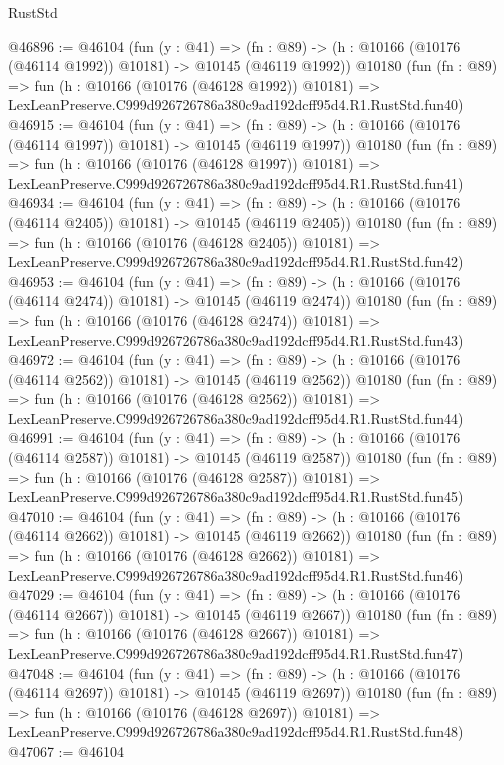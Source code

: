 \begin{lexlean}{RustStd}
\begin{coremodule}
@46896 := @46104
    (fun (y : @41) =>
    (fn : @89) -> (h : @10166 (@10176 (@46114 @1992)) @10181) -> @10145 (@46119 @1992))
    @10180
    (fun (fn : @89) =>
    fun (h : @10166 (@10176 (@46128 @1992)) @10181) =>
    LexLeanPreserve.C999d926726786a380c9ad192dcff95d4.R1.RustStd.fun40)
@46915 := @46104
    (fun (y : @41) =>
    (fn : @89) -> (h : @10166 (@10176 (@46114 @1997)) @10181) -> @10145 (@46119 @1997))
    @10180
    (fun (fn : @89) =>
    fun (h : @10166 (@10176 (@46128 @1997)) @10181) =>
    LexLeanPreserve.C999d926726786a380c9ad192dcff95d4.R1.RustStd.fun41)
@46934 := @46104
    (fun (y : @41) =>
    (fn : @89) -> (h : @10166 (@10176 (@46114 @2405)) @10181) -> @10145 (@46119 @2405))
    @10180
    (fun (fn : @89) =>
    fun (h : @10166 (@10176 (@46128 @2405)) @10181) =>
    LexLeanPreserve.C999d926726786a380c9ad192dcff95d4.R1.RustStd.fun42)
@46953 := @46104
    (fun (y : @41) =>
    (fn : @89) -> (h : @10166 (@10176 (@46114 @2474)) @10181) -> @10145 (@46119 @2474))
    @10180
    (fun (fn : @89) =>
    fun (h : @10166 (@10176 (@46128 @2474)) @10181) =>
    LexLeanPreserve.C999d926726786a380c9ad192dcff95d4.R1.RustStd.fun43)
@46972 := @46104
    (fun (y : @41) =>
    (fn : @89) -> (h : @10166 (@10176 (@46114 @2562)) @10181) -> @10145 (@46119 @2562))
    @10180
    (fun (fn : @89) =>
    fun (h : @10166 (@10176 (@46128 @2562)) @10181) =>
    LexLeanPreserve.C999d926726786a380c9ad192dcff95d4.R1.RustStd.fun44)
@46991 := @46104
    (fun (y : @41) =>
    (fn : @89) -> (h : @10166 (@10176 (@46114 @2587)) @10181) -> @10145 (@46119 @2587))
    @10180
    (fun (fn : @89) =>
    fun (h : @10166 (@10176 (@46128 @2587)) @10181) =>
    LexLeanPreserve.C999d926726786a380c9ad192dcff95d4.R1.RustStd.fun45)
@47010 := @46104
    (fun (y : @41) =>
    (fn : @89) -> (h : @10166 (@10176 (@46114 @2662)) @10181) -> @10145 (@46119 @2662))
    @10180
    (fun (fn : @89) =>
    fun (h : @10166 (@10176 (@46128 @2662)) @10181) =>
    LexLeanPreserve.C999d926726786a380c9ad192dcff95d4.R1.RustStd.fun46)
@47029 := @46104
    (fun (y : @41) =>
    (fn : @89) -> (h : @10166 (@10176 (@46114 @2667)) @10181) -> @10145 (@46119 @2667))
    @10180
    (fun (fn : @89) =>
    fun (h : @10166 (@10176 (@46128 @2667)) @10181) =>
    LexLeanPreserve.C999d926726786a380c9ad192dcff95d4.R1.RustStd.fun47)
@47048 := @46104
    (fun (y : @41) =>
    (fn : @89) -> (h : @10166 (@10176 (@46114 @2697)) @10181) -> @10145 (@46119 @2697))
    @10180
    (fun (fn : @89) =>
    fun (h : @10166 (@10176 (@46128 @2697)) @10181) =>
    LexLeanPreserve.C999d926726786a380c9ad192dcff95d4.R1.RustStd.fun48)
@47067 := @46104

\end{coremodule}
\end{lexlean}
